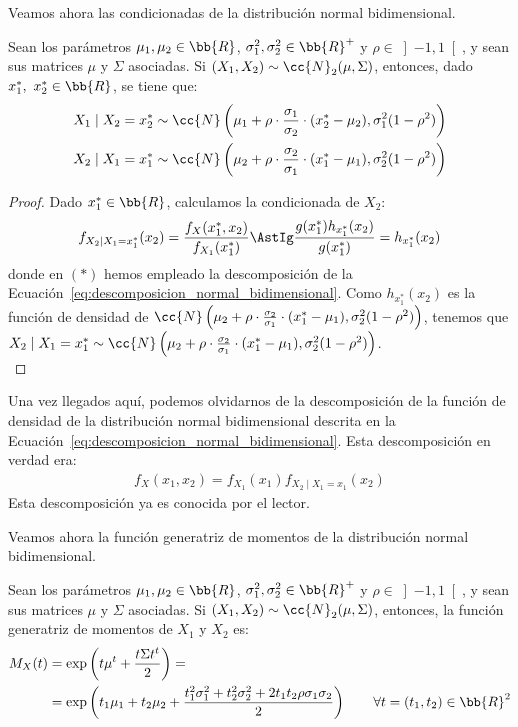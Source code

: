 Veamos ahora las condicionadas de la distribución normal bidimensional.
\begin{prop}
    Sean los parámetros $\mu_1, \mu_2\in \bb{R}$, $\sigma_1^2, \sigma_2^2\in \bb{R}^+$ y $\rho\in \left]-1,1\right[$, y sean sus matrices $\mu$ y $\Sigma$ asociadas.
    Si $(X_1, X_2)\sim \cc{N}_2(\mu, \Sigma)$, entonces, dado $x_1^\ast,~x_2^\ast\in \bb{R}$, se tiene que:
    \begin{align*}
        X_1\mid X_2=x_2^\ast &\sim \cc{N}\left(\mu_1+\rho\cdot \frac{\sigma_1}{\sigma_2}\cdot (x_2^\ast-\mu_2), \sigma_1^2(1-\rho^2)\right)\\
        X_2\mid X_1=x_1^\ast &\sim \cc{N}\left(\mu_2+\rho\cdot \frac{\sigma_2}{\sigma_1}\cdot (x_1^\ast-\mu_1), \sigma_2^2(1-\rho^2)\right)
    \end{align*}
\end{prop}
\begin{proof}
    Dado $x_1^\ast\in \bb{R}$, calculamos la condicionada de $X_2$:
    \begin{equation*}
        f_{X_2\mid X_1=x_1^\ast}(x_2)=\dfrac{f_X(x_1^\ast, x_2)}{f_{X_1}(x_1^\ast)}
        \AstIg \dfrac{g(x_1^\ast)h_{x_1^\ast}(x_2)}{g(x_1^\ast)}
        = h_{x_1^\ast}(x_2)
    \end{equation*}
    donde en $(\ast)$ hemos empleado la descomposición de la Ecuación~\ref{eq:descomposicion_normal_bidimensional}. Como $h_{x_1^\ast}(x_2)$ es la función de densidad de $\cc{N}\left(\mu_2+\rho\cdot \frac{\sigma_2}{\sigma_1}\cdot (x_1^\ast-\mu_1), \sigma_2^2(1-\rho^2)\right)$, tenemos que $X_2\mid X_1=x_1^\ast\sim \cc{N}\left(\mu_2+\rho\cdot \frac{\sigma_2}{\sigma_1}\cdot (x_1^\ast-\mu_1), \sigma_2^2(1-\rho^2)\right)$.\\
\end{proof}
\begin{observacion}
    Una vez llegados aquí, podemos olvidarnos de la descomposición de la función de densidad de la distribución normal bidimensional descrita en la Ecuación~\ref{eq:descomposicion_normal_bidimensional}.
    Esta descomposición en verdad era:
    \begin{align*}
        f_{X}(x_1,x_2) = f_{X_1}(x_1)f_{X_2\mid X_1=x_1}(x_2)
    \end{align*}
    Esta descomposición ya es conocida por el lector.
\end{observacion}


Veamos ahora la función generatriz de momentos de la distribución normal bidimensional.
\begin{prop}
    Sean los parámetros $\mu_1, \mu_2\in \bb{R}$, $\sigma_1^2, \sigma_2^2\in \bb{R}^+$ y $\rho\in \left]-1,1\right[$, y sean sus matrices $\mu$ y $\Sigma$ asociadas.
    Si $(X_1, X_2)\sim \cc{N}_2(\mu, \Sigma)$, entonces, la función generatriz de momentos de $X_1$ y $X_2$ es:    
    \begin{align*}
        M_X(t) &= \exp\left(t \mu^t+\dfrac{t\Sigma t^t}{2}\right)
        =\\&= \exp\left(t_1\mu_1+t_2\mu_2+\dfrac{t_1^2\sigma_1^2+t_2^2\sigma_2^2+2t_1t_2\rho\sigma_1\sigma_2}{2}\right)\qquad \forall t=(t_1, t_2)\in \bb{R}^2
    \end{align*}
\end{prop}